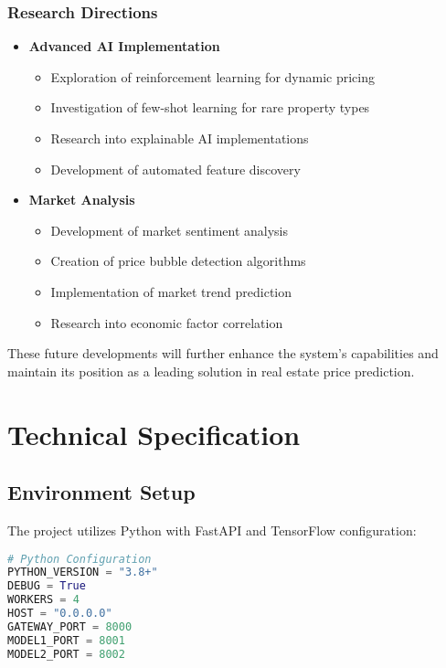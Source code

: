 \documentclass[12pt,a4paper]{report}
\begin{document}
\subsection{Research Directions}
\begin{itemize}
    \item \textbf{Advanced AI Implementation}
    \begin{itemize}
        \item Exploration of reinforcement learning for dynamic pricing
        \item Investigation of few-shot learning for rare property types
        \item Research into explainable AI implementations
        \item Development of automated feature discovery
    \end{itemize}

    \item \textbf{Market Analysis}
    \begin{itemize}
        \item Development of market sentiment analysis
        \item Creation of price bubble detection algorithms
        \item Implementation of market trend prediction
        \item Research into economic factor correlation
    \end{itemize}
\end{itemize}

These future developments will further enhance the system's capabilities and maintain its position as a leading solution in real estate price prediction.

\appendix
\chapter{Technical Specification}

\section{Environment Setup}
The project utilizes Python with FastAPI and TensorFlow configuration:

\begin{lstlisting}[language=python]
# Python Configuration
PYTHON_VERSION = "3.8+"
DEBUG = True
WORKERS = 4
HOST = "0.0.0.0"
GATEWAY_PORT = 8000
MODEL1_PORT = 8001
MODEL2_PORT = 8002
\end{lstlisting}
\end{document}

